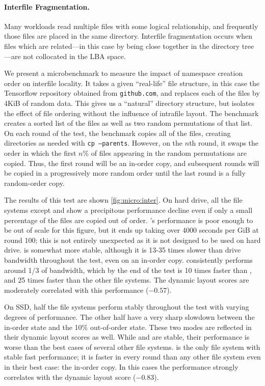 \paragraph{Interfile Fragmentation.}\label{sec:interfile} Many workloads read
multiple files with some logical relationship, and frequently those files are
placed in the same directory. Interfile fragmentation occurs when files which
are related---in this case by being close together in the directory tree---are not
collocated in the LBA space.

We present a microbenchmark to measure the impact of namespace creation order
on interfile locality. It takes a given ``real-life'' file structure, in this
case the Tensorflow repository obtained from \texttt{github.com}, and replaces
each of the files by 4KiB of random data. This gives us a ``natural'' directory
structure, but isolates the effect of file ordering without the influence of
intrafile layout. The benchmark creates a sorted list of the files as well as
two random permutations of that list. On each round of the test, the benchmark
copies all of the files, creating directories as needed with {\tt cp
--parents}.  However, on the $n$th round, it swaps the order in which the first
$n\%$ of files appearing in the random permutations are copied. Thus, the first
round will be an in-order copy, and subsequent rounds will be copied in a
progressively more random order until the last round is a fully random-order
copy.

The results of this test are shown \cref{fig:micro:inter}.  On hard
drive, all the file systems except \betrfs and \xfs show a precipitous
performance decline even if only a small percentage of the files are copied out
of order. \ftwofs's performance is poor enough to be out of scale for this
figure, but it ends up taking over 4000 seconds per GiB at round 100; this is
not entirely unexpected as it is not designed to be used on hard drive. \xfs is
somewhat more stable, although it is 13-35 times slower than drive bandwidth
throughout the test, even on an in-order copy.  \betrfs consistently performs
around 1/3 of bandwidth, which by the end of the test is 10 times faster than
\xfs, and 25 times faster than the other file systems. The dynamic layout
scores are moderately correlated with this performance ($-0.57$).

On SSD, half the file systems perform stably throughout the test with varying
degrees of performance. The other half have a very sharp slowdown between the
in-order state and the 10\% out-of-order state. These two modes are reflected
in their dynamic layout scores as well. While \ext and \zfs are stable, their
performance is worse than the best cases of several other file systems.
\betrfs is the only file system with stable fast performance; it is faster in
every round than any other file system even in their best case: the in-order
copy. In this cases the performance strongly correlates with the dynamic layout
score ($-0.83$).
